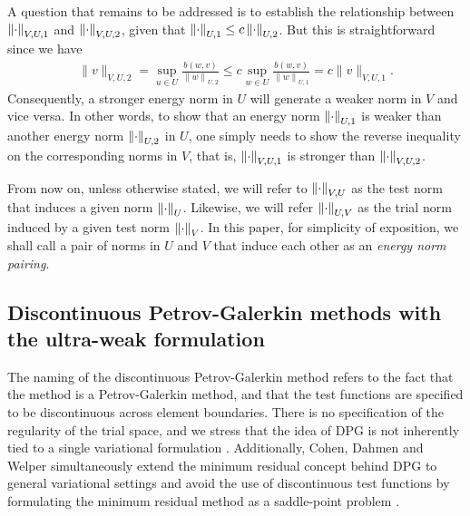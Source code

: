 A question that remains to be addressed is to establish the relationship
between $\nor{\cdot}_{V,U,1}$ and $\nor{\cdot}_{V,U,2}$, given that
$\nor{\cdot}_{U,1} \le c \nor{\cdot}_{U,2}$. But this is
straightforward since we have
\begin{align*}
 \| v \|_{V,U,2} = \sup_{u \in U} \frac{b\left(w,v\right)}{\left\|
  w \right\|_{U,2}} \le c\sup_{w \in U} \frac{b\left(w,v\right)}{\left\| w
  \right\|_{U,1}} = c\| v \|_{V,U,1}.
\end{align*}
Consequently, a stronger energy norm in $U$ will generate a weaker
norm in $V$ and vice versa. In other words, to show that an
energy norm $\nor{\cdot}_{U,1}$ is weaker than another energy norm
$\nor{\cdot}_{U,2}$ in $U$, one simply needs to show the reverse inequality on the
corresponding norms in $V$, that is, $\nor{\cdot}_{V,U,1}$ is stronger
than $\nor{\cdot}_{V,U,2}$.

From now on, unless otherwise stated, we will refer to $\nor{\cdot}_{V,U}$ as the test norm that induces a given norm $\nor{\cdot}_U$. Likewise, we will refer $\nor{\cdot}_{U,V}$ as the trial norm induced by a given test norm $\nor{\cdot}_V$. In this paper, for simplicity of exposition, we shall call a pair of norms in $U$ and $V$ that induce each other as an {\em energy norm pairing}.

\subsection{Discontinuous Petrov-Galerkin methods with the ultra-weak formulation}

The naming of the discontinuous Petrov-Galerkin method refers to the fact that the method is a Petrov-Galerkin method, and that the test functions are specified to be discontinuous across element boundaries. There is no specification of the regularity of the trial space, and we stress that the idea of DPG is not inherently tied to a single variational formulation \cite{Bui-ThanhDemkowiczGhattas11a}. Additionally, Cohen, Dahmen and Welper simultaneously extend the minimum residual concept behind DPG to general variational settings and avoid the use of discontinuous test functions by formulating the minimum residual method as a saddle-point problem \cite{DahmenVariationalStabilization}.  

